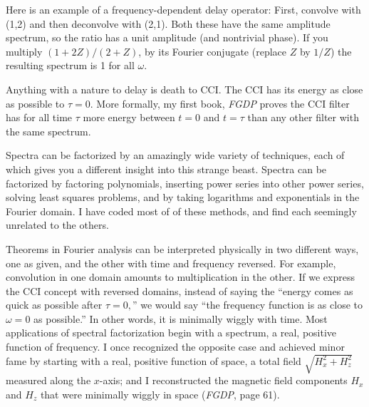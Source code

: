 Here is an example of a frequency-dependent delay operator:
First,
convolve with (1,2) and then deconvolve with (2,1).
Both these have the same amplitude spectrum,
so the ratio has a unit amplitude (and nontrivial phase).
If you multiply $(1+2Z)/(2+Z)$, by its Fourier conjugate
(replace $Z$ by $1/Z$) the resulting spectrum is 1 for all $\omega$.
\par
Anything with a nature to delay is death to CCI.
The CCI has its energy as close as possible to $\tau=0$.
More formally, my first book,
{\em FGDP}
proves the CCI filter
has for all time $\tau$ more energy between $t=0$ and $t=\tau$
than any other filter with the same spectrum.
\par
Spectra can be factorized by an amazingly wide variety of techniques,
each of which gives you a different insight into this strange beast.
Spectra can be factorized by factoring polynomials, inserting power series
into other power series, solving least squares problems,
and by taking logarithms and exponentials in the Fourier domain.
I have coded most of of these methods,
and find each seemingly unrelated to the others.
\par
Theorems in Fourier analysis can be interpreted physically in two
different ways, one as given, and the other with time and frequency reversed.
For example, convolution in one domain amounts to multiplication in the other.
If we express the CCI concept with reversed domains,
instead of saying the ``energy comes as quick as possible after $\tau=0,$''
we would say ``the frequency function is as close to $\omega=0$ as possible.''
In other words, it is minimally wiggly with time.
Most applications of spectral factorization begin with a spectrum,
a real, positive function of frequency.
I once recognized the opposite case
and achieved minor fame by starting with a real, positive function of space,
a total  field $\sqrt{H_x^2 +H_z^2}$ measured along the $x$-axis;
and I reconstructed the magnetic field components $H_x$ and $H_z$
that were minimally wiggly in space ({\em FGDP}, page 61).

